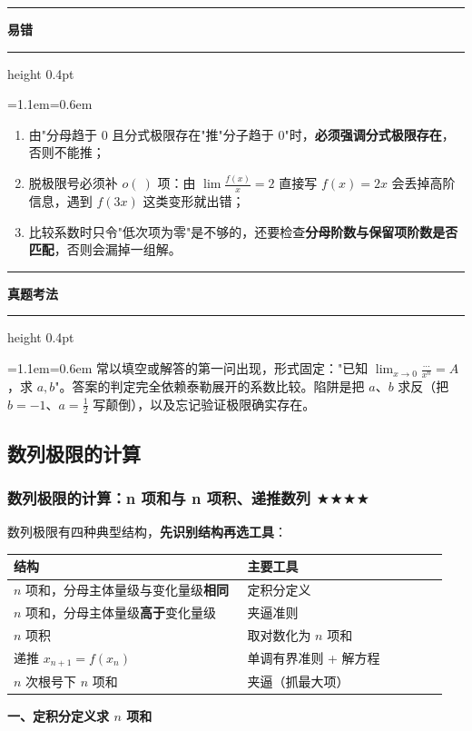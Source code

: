 \documentclass[11pt,openany,UTF8]{ctexbook}
\newcommand{\callouthead}[2]{%
  \par\addvspace{7pt}\noindent
  {\color{#1}\rule[-0.15em]{3pt}{1.05em}}\hspace{0.5em}%
  {\bfseries\color{#1}#2}\par\nobreak\vspace{-0.35em}%
  {\color{rulesep}\hrule height 0.4pt}\nobreak\vspace{0.45em}%
  \begingroup\small\setlength{\parindent}{0pt}%
  \leftskip=1.1em\rightskip=0.6em\noindent\ignorespaces}
\newcommand{\calloutend}{\par\endgroup\addvspace{7pt}}
\newenvironment{callwarn}[1]{\callouthead{warnbar}{#1}}{\calloutend}
\newenvironment{callexam}[1]{\callouthead{exambar}{#1}}{\calloutend}
\begin{document}
\begin{callwarn}{易错}
\begin{enumerate}
\item 由"分母趋于 $0$ 且分式极限存在"推"分子趋于 $0$"时，\textbf{必须强调分式极限存在}，否则不能推；
\item 脱极限号必须补 $o(\ )$ 项：由 $\lim\frac{f(x)}{x}=2$ 直接写 $f(x)=2x$ 会丢掉高阶信息，遇到 $f(3x)$ 这类变形就出错；
\item 比较系数时只令"低次项为零"是不够的，还要检查\textbf{分母阶数与保留项阶数是否匹配}，否则会漏掉一组解。
\end{enumerate}
\end{callwarn}

\begin{callexam}{真题考法}
常以填空或解答的第一问出现，形式固定："已知 $\lim_{x\to 0}\frac{\cdots}{x^{n}}=A$，求 $a,b$"。答案的判定完全依赖泰勒展开的系数比较。陷阱是把 $a$、$b$ 求反（把 $b=-1$、$a=\frac12$ 写颠倒），以及忘记验证极限确实存在。

\end{callexam}

\subsection{数列极限的计算}

\subsubsection{数列极限的计算：n 项和与 n 项积、递推数列 $\bigstar$$\bigstar$$\bigstar$$\bigstar$}

数列极限有四种典型结构，\textbf{先识别结构再选工具}：

\begingroup\small\setlength{\tabcolsep}{4.0pt}
\begin{longtable}{@{}L{0.5075\linewidth}L{0.4382\linewidth}@{}}
\toprule
\textbf{结构} & \textbf{主要工具} \\
\midrule
\endhead
$n$ 项和，分母主体量级与变化量级\textbf{相同} & 定积分定义 \\
$n$ 项和，分母主体量级\textbf{高于}变化量级 & 夹逼准则 \\
$n$ 项积 & 取对数化为 $n$ 项和 \\
递推 $x_{n+1}=f(x_n)$ & 单调有界准则 + 解方程 \\
$n$ 次根号下 $n$ 项和 & 夹逼（抓最大项） \\
\bottomrule
\end{longtable}
\endgroup

\textbf{一、定积分定义求 $n$ 项和}
\end{document}
